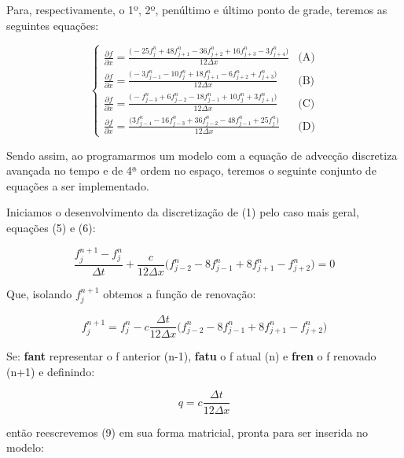 \documentclass[11pt]{article}
\begin{document}
Para, respectivamente, o 1º, 2º, penúltimo e último ponto de grade,
teremos as seguintes equações:

\begin{equation}
\begin{cases}
    \frac{\partial{f}}{\partial{x}} = \frac{\biggl( - 25f^{n}_{j} + 48f^{n}_{j+1} - 36f^{n}_{j+2} + 16f^{n}_{j+3} - 3f^{n}_{j+4} \bigg)}{12\Delta{x}} & \text{(A)}\\
    \frac{\partial{f}}{\partial{x}} = \frac{\biggl( - 3f^{n}_{j-1} - 10f^{n}_{j} + 18f^{n}_{j+1} - 6f^{n}_{j+2} + f^{n}_{j+3} \bigg)}{12\Delta{x}} & \text{(B)}\\
    \frac{\partial{f}}{\partial{x}} = \frac{\biggl( - f^{n}_{j-3} + 6f^{n}_{j-2} - 18f^{n}_{j-1} + 10f^{n}_{j} + 3f^{n}_{j+1} \bigg)}{12\Delta{x}} & \text{(C)}\\
    \frac{\partial{f}}{\partial{x}} = \frac{\biggl( 3f^{n}_{j-4} - 16f^{n}_{j-3} + 36f^{n}_{j-2} - 48f^{n}_{j-1} + 25f^{n}_{j} \bigg)}{12\Delta{x}} & \text{(D)}
\end{cases}
\end{equation}

Sendo assim, ao programarmos um modelo com a equação de advecção
discretiza avançada no tempo e de 4ª ordem no espaço, teremos o seguinte
conjunto de equações a ser implementado.

Iniciamos o desenvolvimento da discretização de (1) pelo caso mais
geral, equações (5) e (6):

\begin{equation}
    \frac{f^{n+1}_{j} - f^{n}_{j}}{\Delta{t}} + \frac{c}{12\Delta{x}}\biggl( f^{n}_{j-2} - 8f^{n}_{j-1} + 8f^{n}_{j+1} - f^{n}_{j+2} \bigg) = 0
\end{equation}

Que, isolando \(f^{n+1}_{j}\) obtemos a função de renovação:

\begin{equation}
    f^{n+1}_{j} = f^{n}_{j}-c\frac{\Delta{t}}{12\Delta{x}}\biggl( f^{n}_{j-2} - 8f^{n}_{j-1} + 8f^{n}_{j+1} - f^{n}_{j+2} \bigg)    
\end{equation}

Se: \textbf{fant} representar o f anterior (n-1), \textbf{fatu} o f
atual (n) e \textbf{fren} o f renovado (n+1) e definindo:

\begin{equation}
    q = c\frac{\Delta{t}}{12\Delta{x}}
\end{equation}

então reescrevemos (9) em sua forma matricial, pronta para ser inserida
no modelo:
\end{document}
